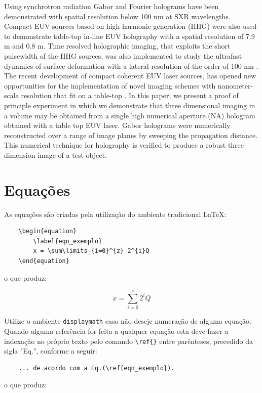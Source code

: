 \documentclass[12pt,A4,A4pt]{article}
\begin{document}
{Using synchrotron radiation Gabor and Fourier holograms have been demonstrated \cite{Mizuuchi2003}
 with spatial resolution below 100 nm at SXR wavelengths.  Compact EUV sources based on high harmonic generation (HHG) were also used to demonstrate table-top in-line EUV holography with a spatial resolution of 7.9 m  and 0.8 m.  Time resolved holographic imaging, that exploits the short pulsewidth of the HHG sources, was also implemented to study the ultrafast dynamics of surface deformation with a lateral resolution of the order of 100 nm \cite{Mizuuchi2005,Nakanishi2007}.  The recent development of compact coherent EUV laser sources,  has opened new opportunities for the implementation of novel imaging schemes with nanometer-scale resolution that fit on a table-top \cite{Mizuuchi2003,scht2000}. In this paper, we present a proof of principle experiment in which we demonstrate that three dimensional imaging in a volume may be obtained from a single high numerical  aperture (NA) hologram obtained with a table top EUV laser. Gabor holograms were numerically reconstructed over a range of image planes by sweeping the propagation distance. This numerical  technique for holography is verified to produce a robust three dimension image of a test object.  

\section{Equações}
As equações são criadas pela utilização do ambiente tradicional \LaTeX:

\begin{verbatim}
    \begin{equation}
        \label{eqn_exemplo}
        x = \sum\limits_{i=0}^{z} 2^{i}Q
    \end{equation}
\end{verbatim}
o que produz:

\begin{equation}
     \label{eqn_exemplo}
      x = \sum\limits_{i=0}^{z} 2^{i}Q
\end{equation}

Utilize o ambiente \verb|displaymath| caso não deseje numeração de alguma equação. Quando alguma referência for feita a qualquer equação esta deve fazer a indexação no próprio texto pelo comando \verb|\ref{}| entre parênteses, precedido da sigla "Eq.", conforme a seguir:

\begin{verbatim}
    ... de acordo com a Eq.(\ref{eqn_exemplo}).
\end{verbatim}
o que produz:

}
\end{document}
